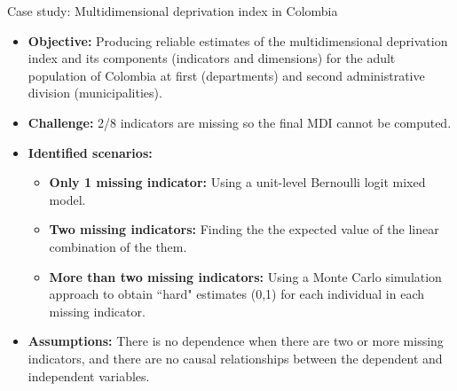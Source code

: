 \documentclass [xcolor=svgnames, t, 9pt] {beamer}
\begin{document}
\begin{frame}{Case study: Multidimensional deprivation index in Colombia}

\vspace{0.3cm}

\begin{itemize}
\item \textbf{Objective:} Producing reliable estimates of the multidimensional deprivation index and its components (indicators and dimensions) for the adult population of Colombia at first (departments) and second administrative division (municipalities). 


\pause
\vspace{0.3cm}

\item \textbf{Challenge:} 2/8 indicators are missing so the final MDI cannot be computed.

\pause

\vspace{0.3cm}

\item \textbf{Identified scenarios:} 
\begin{itemize}
\vspace{0.3cm}
    \item \textbf{Only 1 missing indicator:} Using a unit-level Bernoulli logit mixed model.%
    \pause
\vspace{0.3cm}
    \item \textbf{Two missing indicators:} Finding the the expected value of the linear combination of the them.
    \pause
\vspace{0.3cm}
    \item \textbf{More than two missing indicators:} Using a Monte Carlo simulation approach to obtain ``hard" estimates (0,1) for each individual in each missing indicator.
\end{itemize}  %

\vspace{0.3cm}

\pause

\item \textbf{Assumptions:} There is no dependence when there are two or more missing indicators, and there are no causal relationships between the dependent and independent variables.
\end{itemize}
\end{frame}
\end{document}
